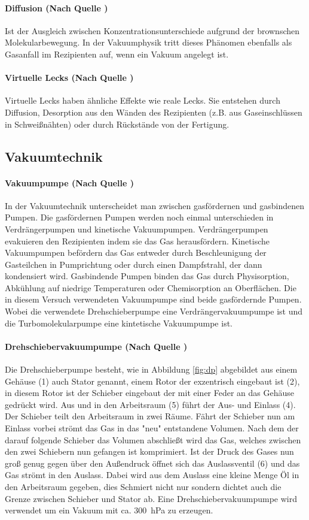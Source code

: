 \paragraph{Diffusion (Nach Quelle \cite{wiki:dif})}
Ist der Ausgleich zwischen Konzentrationsunterschiede aufgrund der brownschen Molekularbewegung.
In der Vakuumphysik tritt dieses Phänomen ebenfalls als Gasanfall im Rezipienten auf, wenn
ein Vakuum angelegt ist.
\paragraph{Virtuelle Lecks (Nach Quelle \cite{wiki:vl})}
Virtuelle Lecks haben ähnliche Effekte wie reale Lecks. Sie entstehen durch Diffusion, Desorption
aus den Wänden des Rezipienten (z.B. aus Gaseinschlüssen in Schweißnähten) oder durch Rückstände
von der Fertigung.

\subsection{Vakuumtechnik}
\paragraph{Vakuumpumpe (Nach Quelle \cite{pfeiffer})}
In der Vakuumtechnik unterscheidet man zwischen gasfördernen und gasbindenen Pumpen. Die
gasfördernen Pumpen werden noch einmal unterschieden
in Verdrängerpumpen und kinetische Vakuumpumpen.
Verdrängerpumpen evakuieren den Rezipienten indem sie das Gas herausfördern. Kinetische
Vakuumpumpen befördern das Gas entweder durch Beschleunigung der Gasteilchen in Pumprichtung oder
durch einen Dampfstrahl, der dann kondensiert wird. Gasbindende Pumpen binden das Gas durch
Physisorption, Abkühlung auf niedrige Temperaturen oder Chemisorption an Oberflächen.
Die in diesem Versuch verwendeten Vakuumpumpe sind beide gasfördernde Pumpen. Wobei
die verwendete Drehschieberpumpe eine Verdrängervakuumpumpe ist und die Turbomolekularpumpe
eine kintetische Vakuumpumpe ist.

\paragraph{Drehschiebervakuumpumpe (Nach Quelle \cite{pfeiffer})}
Die Drehschieberpumpe besteht, wie in Abbildung \ref{fig:dp} abgebildet aus einem Gehäuse (1)
auch Stator genannt, einem
Rotor der exzentrisch eingebaut ist (2), in diesem Rotor ist der Schieber eingebaut der mit einer
Feder an das Gehäuse gedrückt wird. Aus und in den Arbeitsraum (5) führt der Aus- und Einlass (4).
Der Schieber teilt den Arbeitsraum in zwei Räume. Fährt der Schieber nun am Einlass vorbei
strömt das Gas in das "neu" entstandene Volumen. Nach dem der darauf folgende Schieber das Volumen
abschließt wird das Gas, welches zwischen den zwei Schiebern nun gefangen ist komprimiert.
Ist der Druck des Gases nun groß genug gegen über den Außendruck öffnet sich das Auslassventil (6)
und das Gas strömt in den Auslass. Dabei wird aus dem Auslass eine kleine Menge Öl in den
Arbeitsraum gegeben, dies Schmiert nicht nur sondern dichtet auch die Grenze zwischen Schieber und
Stator ab. Eine Drehschiebervakuumpumpe wird verwendet um ein Vakuum mit ca. \SI{300}{\hecto\pascal}
zu erzeugen.


